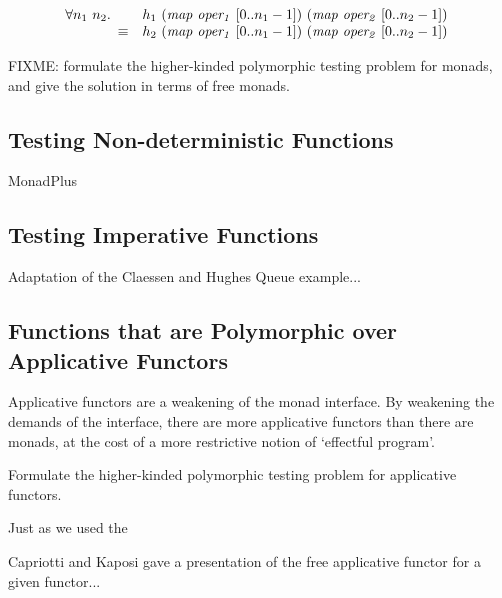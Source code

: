 \documentclass{llncs}
\begin{document}




\begin{displaymath}
  \forall n_1~n_2.
  \begin{array}[t]{cl}
    &h_1~(\mathit{map}~\mathit{oper_1}~[0..n_1-1])~(\mathit{map}~\mathit{oper_2}~[0..n_2-1]) \\
    \equiv &h_2~(\mathit{map}~\mathit{oper_1}~[0..n_1-1])~(\mathit{map}~\mathit{oper_2}~[0..n_2-1])
  \end{array}
\end{displaymath}

FIXME: formulate the higher-kinded polymorphic testing problem for
monads, and give the solution in terms of free monads.

\subsection{Testing Non-deterministic Functions}

MonadPlus

\subsection{Testing Imperative Functions}

Adaptation of the Claessen and Hughes Queue example...

\subsection{Functions that are Polymorphic over Applicative Functors}

Applicative functors \cite{mcbride-patterson} are a weakening of the
monad interface. By weakening the demands of the interface, there are
more applicative functors than there are monads, at the cost of a more
restrictive notion of `effectful program'.

Formulate the higher-kinded polymorphic testing problem for
applicative functors.

Just as we used the 

Capriotti and Kaposi gave a presentation of the free applicative
functor for a given functor...
\end{document}
